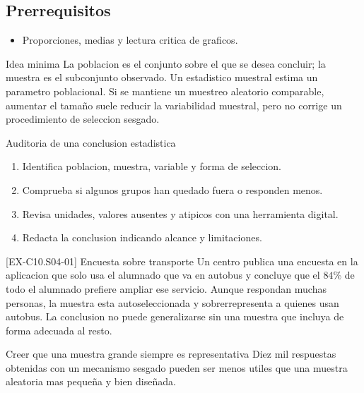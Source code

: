 \subsection*{Prerrequisitos}
\begin{itemize}
  \item Proporciones, medias y lectura critica de graficos.
\end{itemize}

\begin{theorybox}{Idea minima}
La poblacion es el conjunto sobre el que se desea concluir; la muestra es el subconjunto
observado. Un estadistico muestral estima un parametro poblacional. Si se mantiene un muestreo
aleatorio comparable, aumentar el tamaño suele reducir la variabilidad muestral, pero no corrige
un procedimiento de seleccion sesgado.
\end{theorybox}

\begin{methodbox}{Auditoria de una conclusion estadistica}
\begin{enumerate}
  \item Identifica poblacion, muestra, variable y forma de seleccion.
  \item Comprueba si algunos grupos han quedado fuera o responden menos.
  \item Revisa unidades, valores ausentes y atipicos con una herramienta digital.
  \item Redacta la conclusion indicando alcance y limitaciones.
\end{enumerate}
\end{methodbox}

\begin{solvedexample}{[EX-C10.S04-01] Encuesta sobre transporte}
Un centro publica una encuesta en la aplicacion que solo usa el alumnado que va en autobus y
concluye que el \(84\%\) de todo el alumnado prefiere ampliar ese servicio. Aunque respondan
muchas personas, la muestra esta autoseleccionada y sobrerrepresenta a quienes usan autobus. La
conclusion no puede generalizarse sin una muestra que incluya de forma adecuada al resto.
\end{solvedexample}

\begin{commonerror}{Creer que una muestra grande siempre es representativa}
Diez mil respuestas obtenidas con un mecanismo sesgado pueden ser menos utiles que una muestra
aleatoria mas pequeña y bien diseñada.
\end{commonerror}

